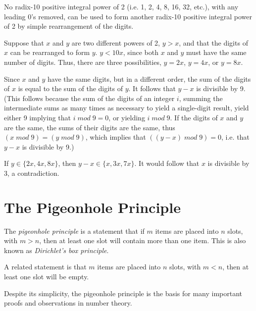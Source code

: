 \begin{vworktheoremstatement}
No radix-10 positive integral power of 2 (i.e. 1, 2, 4, 8, 16, 32, etc.), with
any leading 0's removed, can be used
to form another radix-10 positive integral power of 2 by simple rearrangement
of the digits.
\end{vworktheoremstatement}
\begin{vworktheoremproof}
Suppose that $x$ and $y$ are two different powers of 2, $y>x$, and that
the digits of $x$ can be rearranged to form $y$.  $y<10x$, since both
$x$ and $y$ must have the same number of digits.  Thus, there
are three possibilities, $y=2x$, $y=4x$, or $y=8x$.

Since $x$ and $y$ have the same digits, but in a different order,
the sum of the digits of $x$ is equal to the sum of the digits of $y$.
It follows that $y-x$ is divisible by 9.  (This follows because
the sum of the digits of an integer $i$, summing the intermediate
sums as many times as necessary to yield a single-digit result,
yield either 9 implying that $i \; mod \; 9 = 0$, or yielding $i \; mod \; 9$.
If the digits of $x$ and $y$ are the same,
the sums of their digits are the same, thus $(x \; mod \; 9) = (y \; mod \; 9)$,
which implies that $((y-x) \; mod \; 9) = 0$, i.e. that $y-x$ is divisible
by 9.)

If $y \in \{ 2x, 4x, 8x \}$, then $y-x \in \{ x, 3x, 7x \}$.  It would
follow that $x$ is divisible by 3, a contradiction.
\end{vworktheoremproof}
\vworktheoremfooter{}

\section{The Pigeonhole Principle}
\label{cmtn0:sphp0}

The \emph{pigeonhole principle} is a statement 
that if $m$ items are placed into $n$ slots, with $m > n$, then at least one
slot will contain more than one item.  This is also known as
\emph{Dirichlet's box principle}.

A related statement is that $m$ items are placed into $n$ slots, 
with $m < n$, then at least one
slot will be empty.

Despite its simplicity, the pigeonhole principle is the basis for many important
proofs and observations in number theory.


